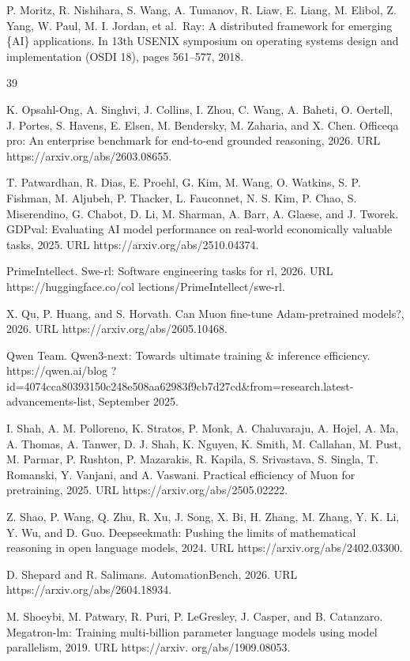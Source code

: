 \documentclass[
  10
]{article}
\begin{document}
P. Moritz, R. Nishihara, S. Wang, A. Tumanov, R. Liaw, E. Liang, M.
Elibol, Z. Yang, W. Paul, M. I. Jordan, et al.~Ray: A distributed
framework for emerging \{AI\} applications. In 13th USENIX symposium on
operating systems design and implementation (OSDI 18), pages 561--577,
2018.

39

K. Opsahl-Ong, A. Singhvi, J. Collins, I. Zhou, C. Wang, A. Baheti, O.
Oertell, J. Portes, S. Havens, E. Elsen, M. Bendersky, M. Zaharia, and
X. Chen. Officeqa pro: An enterprise benchmark for end-to-end grounded
reasoning, 2026. URL https://arxiv.org/abs/2603.08655.

T. Patwardhan, R. Dias, E. Proehl, G. Kim, M. Wang, O. Watkins, S. P.
Fishman, M. Aljubeh, P. Thacker, L. Fauconnet, N. S. Kim, P. Chao, S.
Miserendino, G. Chabot, D. Li, M. Sharman, A. Barr, A. Glaese, and J.
Tworek. GDPval: Evaluating AI model performance on real-world
economically valuable tasks, 2025. URL https://arxiv.org/abs/2510.04374.

PrimeIntellect. Swe-rl: Software engineering tasks for rl, 2026. URL
https://huggingface.co/col lections/PrimeIntellect/swe-rl.

X. Qu, P. Huang, and S. Horvath. Can Muon fine-tune Adam-pretrained
models?, 2026. URL https://arxiv.org/abs/2605.10468.

Qwen Team. Qwen3-next: Towards ultimate training \& inference efficiency.
https://qwen.ai/blog
?id=4074cca80393150c248e508aa62983f9cb7d27cd\&from=research.latest-advancements-list,
September 2025.

I. Shah, A. M. Polloreno, K. Stratos, P. Monk, A. Chaluvaraju, A. Hojel,
A. Ma, A. Thomas, A. Tanwer, D. J. Shah, K. Nguyen, K. Smith, M.
Callahan, M. Pust, M. Parmar, P. Rushton, P. Mazarakis, R. Kapila, S.
Srivastava, S. Singla, T. Romanski, Y. Vanjani, and A. Vaswani.
Practical efficiency of Muon for pretraining, 2025. URL
https://arxiv.org/abs/2505.02222.

Z. Shao, P. Wang, Q. Zhu, R. Xu, J. Song, X. Bi, H. Zhang, M. Zhang, Y.
K. Li, Y. Wu, and D. Guo. Deepseekmath: Pushing the limits of
mathematical reasoning in open language models, 2024. URL
https://arxiv.org/abs/2402.03300.

D. Shepard and R. Salimans. AutomationBench, 2026. URL
https://arxiv.org/abs/2604.18934.

M. Shoeybi, M. Patwary, R. Puri, P. LeGresley, J. Casper, and B.
Catanzaro. Megatron-lm: Training multi-billion parameter language models
using model parallelism, 2019. URL https://arxiv. org/abs/1909.08053.
\end{document}
